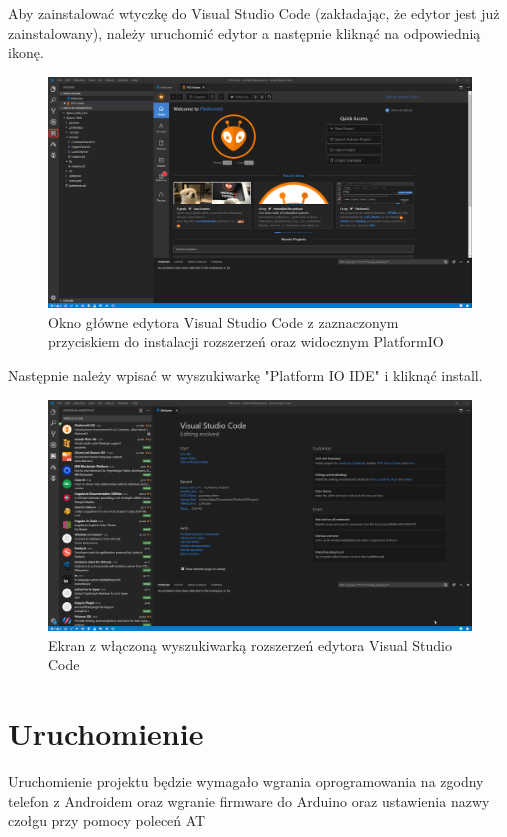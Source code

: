 \documentclass{report}
\begin{document}
		Aby zainstalować wtyczkę do Visual Studio Code (zakładając, że edytor jest już zainstalowany), należy uruchomić edytor a następnie kliknąć na odpowiednią ikonę.
		
		\begin{figure}[H]
			\centering
			\includegraphics[scale=0.25]{code_1.png}
			\caption{Okno główne edytora Visual Studio Code z zaznaczonym przyciskiem do instalacji rozszerzeń oraz widocznym PlatformIO}
		\end{figure}
	
		Następnie należy wpisać w wyszukiwarkę "Platform IO IDE"  i kliknąć install. 
		
			\begin{figure}[H]
			\centering
			\includegraphics[scale=0.25]{code_2.png}
			\caption{Ekran z włączoną wyszukiwarką rozszerzeń edytora Visual Studio Code}
		\end{figure}
		
    \chapter{Uruchomienie}
        Uruchomienie projektu będzie wymagało wgrania oprogramowania na zgodny telefon z Androidem oraz wgranie firmware do Arduino oraz ustawienia nazwy czołgu przy pomocy poleceń AT
\end{document}
